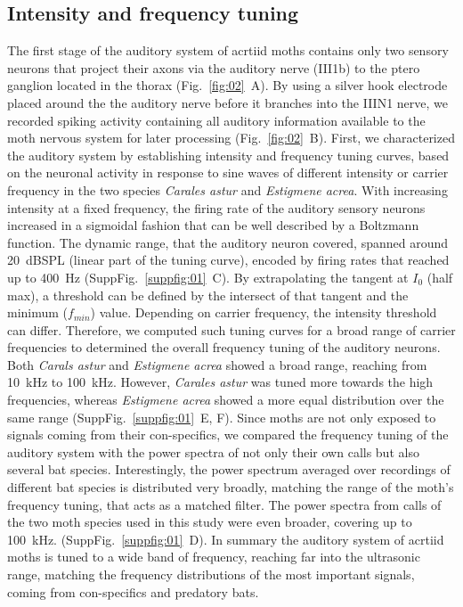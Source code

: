 \documentclass[12pt,a4paper]{article}
\newcommand{\species}[1]{\textit{#1}}
\newcommand{\fig}[2]{(Fig.~#1~#2)}
\newcommand{\suppfig}[2]{(SuppFig.~#1~#2)}
\begin{document}
\subsection{Intensity and frequency tuning}
The first stage of the auditory system of acrtiid moths contains only two sensory neurons that project their axons via the auditory nerve (III1b) to the ptero ganglion located in the thorax \fig{\ref{fig:02}}{A}. By using a silver hook electrode placed around the the auditory nerve before it branches into the  IIIN1 nerve, we recorded spiking activity containing all auditory information available to the moth nervous system for later processing \fig{\ref{fig:02}}{B}. 
First, we characterized the auditory system by establishing intensity and frequency tuning curves, based on the neuronal activity in response to sine waves of different intensity or carrier frequency in the two species \species{Carales astur} and \species{Estigmene acrea}. With increasing intensity at a fixed frequency, the firing rate of the auditory sensory neurons increased in a sigmoidal fashion that can be well described by a Boltzmann function. The dynamic range, that the auditory neuron covered, spanned around 20~dBSPL (linear part of the tuning curve), encoded by firing rates that reached up to 400~Hz \suppfig{\ref{suppfig:01}}{C}. By extrapolating the tangent at $I_{0}$ (half max), a threshold can be defined by the intersect of that tangent and the minimum ($f_{min}$) value. Depending on carrier frequency, the intensity threshold can differ. Therefore, we computed such tuning curves for a broad range of carrier frequencies to determined the overall frequency tuning of the auditory neurons. Both \species{Carals astur} and \species{Estigmene acrea} showed a broad range, reaching from 10~kHz to 100~kHz. However, \species{Carales astur} was tuned more towards the high frequencies, whereas \species{Estigmene acrea} showed a more equal distribution over the same range \suppfig{\ref{suppfig:01}}{E, F}. Since moths are not only exposed to signals coming from their con-specifics, we compared the frequency tuning of the auditory system with the power spectra of not only their own calls but also several bat species. Interestingly, the power spectrum averaged over recordings of different bat species is distributed very broadly, matching the range of the moth's frequency tuning, that acts as a matched filter. The power spectra from calls of the two moth species used in this study were even broader, covering up to 100~kHz.  \suppfig{\ref{suppfig:01}}{D}. In summary the auditory system of acrtiid moths is tuned to a wide band of frequency, reaching far into the ultrasonic range, matching the frequency distributions of the most important signals, coming from con-specifics and predatory bats.
  
\end{document}
